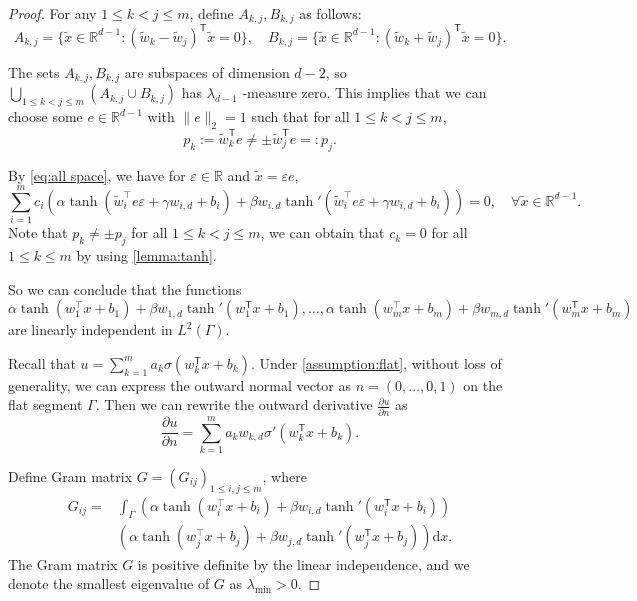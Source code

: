 \documentclass{article}
\renewcommand{\d}{\mathrm{d}}
\newcommand{\T}{\mathsf{T}}
\begin{document}
\begin{proof}
    For any $1\le k<j\le m$, define $A_{k,j}, B_{k,j}$ as follows:
    \begin{equation*}
        A_{k,j}=\{\tilde{x}\in \mathbb{R}^{d-1}: (\tilde{w}_{k}-\tilde{w}_{j})^\T \tilde{x}=0\}, \quad B_{k,j}=\{\tilde{x}\in \mathbb{R}^{d-1}: (\tilde{w}_{k}+\tilde{w}_{j})^\T \tilde{x}=0\}.
    \end{equation*}
    
    The sets $A_{k,j}, B_{k,j}$ are subspaces of dimension $d-2$, so $\bigcup_{1\le k<j\le m}(A_{k,j}\cup B_{k,j})$ has $\lambda_{d-1}$
-measure zero. This implies that we can choose some $e\in \mathbb{R}^{d-1}$ with $\|e\|_{2}=1$ such that for all $1\le k<j\le m$,  
\begin{equation*}
p_{k}:=\tilde{w}_{k}^\T e\neq \pm\tilde{w}_{j}^\T e =: p_{j} . 
\end{equation*}

By \cref{eq:all space}, we have for $\varepsilon \in \mathbb{R}$ and $\tilde{x}=\varepsilon e$,
\begin{equation*}
    \sum_{i=1}^{m}c_{i}\left( \alpha \tanh(\tilde{w}_i^\top  e \varepsilon  +\gamma w_{i,d}+ b_i)+\beta w_{i,d} \tanh'(\tilde{w}_i^\top e \varepsilon +\gamma w_{i,d}+b_i)\right)=0, \quad \forall \tilde{x} \in \mathbb{R}^{d-1} .\label{eq:all space1}
\end{equation*}
Note that $p_{k}\neq \pm p_{j}$ for all $1\le k<j\le m$, we can obtain that $c_{k}=0$ for all $1\le k\le m$ by using \cref{lemma:tanh}.

So we can conclude that the functions
\begin{equation*}
    \alpha \tanh(w_1^\top x + b_1)+\beta w_{1,d} \tanh'(w_1^\T x+b_1), \ldots, \alpha \tanh(w_m^\top x + b_m)+\beta w_{m,d} \tanh'(w_m^\T x+b_m)
\end{equation*}
are linearly independent in \(L^{2}(\Gamma)\).

Recall that $u=\sum_{k=1}^{m}a_k \sigma(w_k ^\T x+ b_k)$.
Under \cref{assumption:flat}, without loss of generality, we can express the outward normal vector as \(n = (0, \ldots, 0, 1)\) on the flat segment \(\Gamma\). Then we can rewrite the outward derivative $\frac{\partial u}{\partial n}$ as
\begin{equation*}
    \frac{\partial u}{\partial n} = \sum_{k=1}^{m} a_k w_{k,d} \sigma'(w_k^\T x + b_k).
\end{equation*}

Define Gram matrix \(G=(G_{ij})_{1\le i, j\le m}\),  where 
\begin{equation*}
    \begin{aligned}
        G_{ij}=&\int_{\Gamma} \left(\alpha \tanh(w_i^\top x + b_i)+\beta w_{i,d} \tanh'(w_i^\T x+b_i)\right)\\
        \quad&\left( \alpha \tanh(w_j^\top x + b_j)+\beta w_{j,d} \tanh'(w_j^\T x+b_j)\right)\d x.
    \end{aligned}
\end{equation*}
The Gram matrix \(G\) is positive definite by the linear independence, and we denote the smallest eigenvalue of $G$ as $\lambda_{\text{min}}>0$.


\end{proof}
\end{document}

